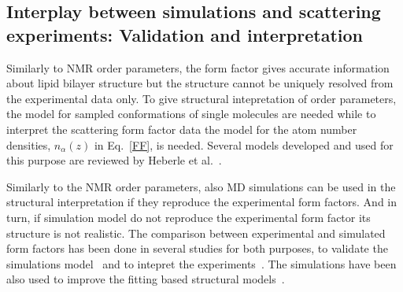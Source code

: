 \documentclass[aps,prl,superscriptaddress,twocolumn]{revtex4}
\begin{document}
\subsection{Interplay between simulations and scattering experiments: Validation and interpretation}
Similarly to NMR order parameters, the form factor gives accurate information about lipid
bilayer structure but the structure cannot be uniquely resolved from the experimental data only.
To give structural intepretation of order parameters, the model for sampled conformations of 
single molecules are needed while to interpret the scattering form factor data the model
for the atom number densities, $n_\alpha(z)$ in Eq.~\ref{FF}, is needed.
Several models developed and used for this purpose are reviewed by Heberle et al.~\cite{heberle12}.

Similarly to the NMR order parameters, also MD simulations can be used in the structural
interpretation if they reproduce the experimental form factors. And in turn,
if simulation model do not reproduce the experimental form factor its structure is not 
realistic. The comparison between experimental and simulated form factors has been done 
in several studies for both purposes, to validate the simulations 
model~\cite{hogberg08,chiu09,klauda10,dickson12,jambeck12,lim12,klauda12,jambeck13,chowdhary13,lee14,maciejewski14,dickson14,tjornhammar14,madej15,kulig15b} and to intepret the experiments~\cite{sachs03,klauda06,kucerka08a,kucerka08b,braun13}. 
The simulations have been also used to improve the fitting based structural models~\cite{??}.
\end{document}
